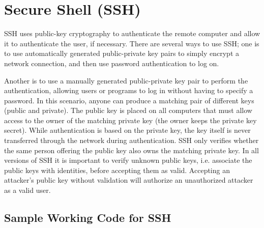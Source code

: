 
\chapter{Secure Shell (SSH)}
SSH uses public-key cryptography to authenticate the remote computer and allow it to authenticate the user, if necessary. There are several ways to use SSH; one is to use automatically generated public-private key pairs to simply encrypt a network connection, and then use password authentication to log on.

Another is to use a manually generated public-private key pair to perform the authentication, allowing users or programs to log in without having to specify a password. In this scenario, anyone can produce a matching pair of different keys (public and private). The public key is placed on all computers that must allow access to the owner of the matching private key (the owner keeps the private key secret). While authentication is based on the private key, the key itself is never transferred through the network during authentication. SSH only verifies whether the same person offering the public key also owns the matching private key. In all versions of SSH it is important to verify unknown public keys, i.e. associate the public keys with identities, before accepting them as valid. Accepting an attacker's public key without validation will authorize an unauthorized attacker as a valid user.
\section{ Sample Working Code for SSH}
   
